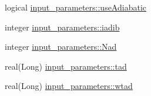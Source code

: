 \begin{DoxyCompactItemize}
\item 
logical \hyperlink{namespaceinput__parameters_ac1165234d614ad278effaf2a7910888b}{input\_\-parameters::useAdiabatic}
\item 
integer \hyperlink{namespaceinput__parameters_a2b1e4d8baaa62168d989002cf747b30b}{input\_\-parameters::iadib}
\item 
integer \hyperlink{namespaceinput__parameters_a6e8306262594749651ff9230cb525363}{input\_\-parameters::Nad}
\item 
real(Long) \hyperlink{namespaceinput__parameters_ab3ac3c45168fc6aafd02e70822154417}{input\_\-parameters::tad}
\item 
real(Long) \hyperlink{namespaceinput__parameters_a8d452c8a3d45ee77279fc26867c74ed6}{input\_\-parameters::wtad}
\end{DoxyCompactItemize}
